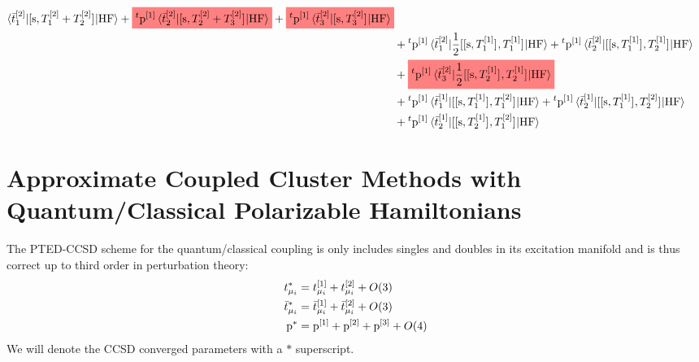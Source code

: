\begin{equation}
\begin{aligned}
    \braket{\tbar{1}^{[2]} | \commutator{\s}{T_1^{[2]} + T_2^{[2]}} | \mathrm{HF}}
    +
    \highlight{red}{
    {}^t\p^{[1]}
    \braket{\tbar{2}^{[2]} | \commutator{\s}{T_2^{[2]} + T_3^{[2]}} | \mathrm{HF}}
    }
    +
    \highlight{red}{
    {}^t\p^{[1]}
    \braket{\tbar{3}^{[2]} | \commutator{\s}{T_3^{[2]}} | \mathrm{HF}}
    } \\
    &+
    {}^t\p^{[1]}
    \braket{\tbar{1}^{[2]} |
    \frac{1}{2}\commutator{\commutator{\s}{T_1^{[1]}}}{T_1^{[1]}}
    | \mathrm{HF}}
    +
    {}^t\p^{[1]}
    \braket{\tbar{2}^{[2]} |
    \commutator{\commutator{\s}{T_1^{[1]}}}{T_2^{[1]}}
    | \mathrm{HF}} \\
    &+
    \highlight{red}{
    {}^t\p^{[1]}
    \braket{\tbar{3}^{[2]} |
    \frac{1}{2}\commutator{\commutator{\s}{T_2^{[1]}}}{T_2^{[1]}}
    | \mathrm{HF}}
    } \\
    &+ {}^t\p^{[1]}
    \braket{\tbar{1}^{[1]} |
    \commutator{\commutator{\s}{T_1^{[1]}}}{T_1^{[2]}}
    | \mathrm{HF}}
    + {}^t\p^{[1]}
    \braket{\tbar{2}^{[1]} |
    \commutator{\commutator{\s}{T_1^{[1]}}}{T_2^{[2]}}
    | \mathrm{HF}} \\
    &+ {}^t\p^{[1]}
    \braket{\tbar{2}^{[1]} |
    \commutator{\commutator{\s}{T_2^{[1]}}}{T_1^{[2]}}
    | \mathrm{HF}}
  \end{aligned}
\end{equation}

\section[Approximate Coupled Cluster Methods]{
Approximate Coupled Cluster Methods with Quantum/Classical Polarizable Hamiltonians
}\label{sec:cc-approximate-quantum-classical}

The \acrshort{PTED}-\acrshort{CCSD} scheme for the quantum/classical coupling is
only includes singles and doubles in its excitation manifold and is thus
correct up to third order in perturbation theory:
\begin{subequations}
  \begin{align}
    t_{\mu_i}^{*} &= t_{\mu_i}^{[1]} + t_{\mu_i}^{[2]} + O(3)
    \label{eq:tamp-star} \\
    \bar{t}_{\mu_i}^{*} &= \bar{t}_{\mu_i}^{[1]} + \bar{t}_{\mu_i}^{[2]} + O(3)
    \label{eq:tbar-star} \\
    \mathrm{p}^{*} &= \mathrm{p}^{[1]} + \mathrm{p}^{[2]} + \mathrm{p}^{[3]} + O(4)
    \label{eq:p-star}
  \end{align}
\end{subequations}
We will denote the \acrshort{CCSD} converged parameters with a $*$ superscript.

